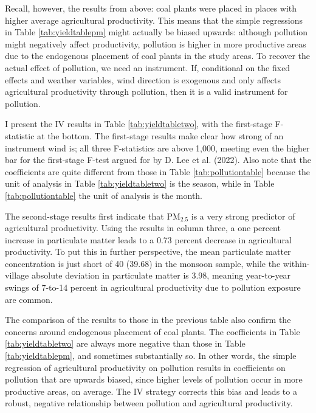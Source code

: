 \documentclass[
]{article}
\begin{document}
Recall, however, the results from above: coal plants were placed in places with higher average agricultural productivity. This means that the simple regressions in Table \ref{tab:yieldtablepm} might actually be biased upwards: although pollution might negatively affect productivity, pollution is higher in more productive areas due to the endogenous placement of coal plants in the study areas. To recover the actual effect of pollution, we need an instrument. If, conditional on the fixed effects and weather variables, wind direction is exogenous and only affects agricultural productivity through pollution, then it is a valid instrument for pollution.

I present the IV results in Table \ref{tab:yieldtabletwo}, with the first-stage F-statistic at the bottom. The first-stage results make clear how strong of an instrument wind is; all three F-statistics are above 1,000, meeting even the higher bar for the first-stage F-test argued for by D. Lee et al. (2022). Also note that the coefficients are quite different from those in Table \ref{tab:pollutiontable} because the unit of analysis in Table \ref{tab:yieldtabletwo} is the season, while in Table \ref{tab:pollutiontable} the unit of analysis is the month.

The second-stage results first indicate that \(\mathrm{PM_{2.5}}\) is a very strong predictor of agricultural productivity. Using the results in column three, a one percent increase in particulate matter leads to a 0.73 percent decrease in agricultural productivity. To put this in further perspective, the mean particulate matter concentration is just short of 40 (39.68) in the monsoon sample, while the within-village absolute deviation in particulate matter is 3.98, meaning year-to-year swings of 7-to-14 percent in agricultural productivity due to pollution exposure are common.

The comparison of the results to those in the previous table also confirm the concerns around endogenous placement of coal plants. The coefficients in Table \ref{tab:yieldtabletwo} are always more negative than those in Table \ref{tab:yieldtablepm}, and sometimes substantially so. In other words, the simple regression of agricultural productivity on pollution results in coefficients on pollution that are upwards biased, since higher levels of pollution occur in more productive areas, on average. The IV strategy corrects this bias and leads to a robust, negative relationship between pollution and agricultural productivity.
\end{document}
